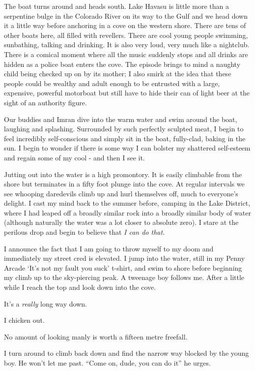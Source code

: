 \documentclass[a5paper,titlepage,11pt]{book}
\begin{document}
The boat turns around and heads south. Lake Havasu is little more than a serpentine bulge in the Colorado River on its way to the Gulf and we head down it a little way before anchoring in a cove on the western shore. There are tens of other boats here, all filled with revellers. There are cool young people swimming, sunbathing, talking and drinking. It is also very loud, very much like a nightclub. There is a comical moment where all the music suddenly stops and all drinks are hidden as a police boat enters the cove. The episode brings to mind a naughty child being checked up on by its mother; I also smirk at the idea that these people could be wealthy and adult enough to be entrusted with a large, expensive, powerful motorboat but still have to hide their can of light beer at the sight of an authority figure.

Our buddies and Imran dive into the warm water and swim around the boat, laughing and splashing. Surrounded by such perfectly sculpted meat, I begin to feel incredibly self-conscious and simply sit in the boat, fully-clad, baking in the sun. I begin to wonder if there is some way I can bolster my shattered self-esteem and regain some of my cool - and then I see it.

Jutting out into the water is a high promontory. It is easily climbable from the shore but terminates in a fifty foot plunge into the cove. At regular intervals we see whooping daredevils climb up and hurl themselves off, much to everyone's delight. I cast my mind back to the summer before, camping in the Lake District, where I had leaped off a broadly similar rock into a broadly similar body of water (although naturally the water was a lot closer to absolute zero). I stare at the perilous drop and begin to believe that \emph{I can do that}.

I announce the fact that I am going to throw myself to my doom and immediately my street cred is elevated. I jump into the water, still in my Penny Arcade `It's not my fault you suck' t-shirt, and swim to shore before beginning my climb up to the sky-piercing peak. A tweenage boy follows me. After a little while I reach the top and look down into the cove.

It's a \emph{really} long way down.

I chicken out.

No amount of looking manly is worth a fifteen metre freefall.

I turn around to climb back down and find the narrow way blocked by the young boy. He won't let me past. ``Come on, dude, you can do it'' he urges.
\end{document}
